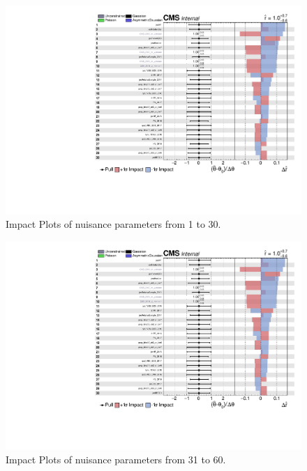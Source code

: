 \begin{figure}[!ht]
  \centering
  \includegraphics[width=\textwidth,page=1]{analysis_plots/impact_plots/impacts_datacard_run2_z.pdf}
  \caption[Impact Plots of nuisance parameters from 1 to 30.]%
  {Impact Plots of nuisance parameters from 1 to 30.}%
  \label{fig:vbs-impact-plots-page1}
\end{figure}

\begin{figure}[!ht]
  \centering
  \includegraphics[width=\textwidth,page=2]{analysis_plots/impact_plots/impacts_datacard_run2_z.pdf}
  \caption[Impact Plots of nuisance parameters from 31 to 60.]%
  {Impact Plots of nuisance parameters from 31 to 60.}%
  \label{fig:vbs-impact-plots-page2}
\end{figure}


